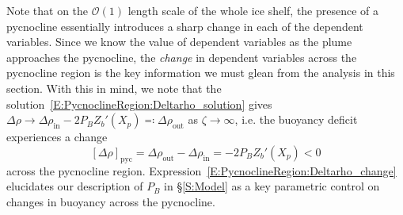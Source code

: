 \documentclass[openacc]{rsproca_new}%
\newcommand{\order}[1]{\mathcal{O}(#1)}
\newcommand{\Pb}{\textit{P}_B}  %
\renewcommand{\in}{\text{in}} %
\newcommand{\out}{\text{out}}
\begin{document}
Note that on the $\order{1}$ length scale of the whole ice shelf, the presence of a pycnocline essentially introduces a sharp change in each of the dependent variables. Since we know the value of dependent variables as the plume approaches the pycnocline, the \textit{change} in dependent variables across the pycnocline region is the key information we must glean from the analysis in this section. With this in mind, we note that the solution~\eqref{E:PycnoclineRegion:Deltarho_solution} gives $\Delta \rho \to \Delta \rho_{\in} - 2 \Pb Z_b'(X_p)  \eqcolon \Delta \rho_\out$ as $\zeta \to \infty$, i.e. the buoyancy deficit experiences a change
\begin{equation}\label{E:PycnoclineRegion:Deltarho_change}
\left[\Delta \rho\right]_{\text{pyc}} = \Delta \rho_\out - \Delta \rho_\in = - 2 \Pb Z_b'(X_p) < 0
\end{equation}
across the pycnocline region. Expression~\eqref{E:PycnoclineRegion:Deltarho_change} elucidates our description of $\Pb$ in \S\ref{S:Model} as a key parametric control on changes in buoyancy across the pycnocline.
\end{document}
